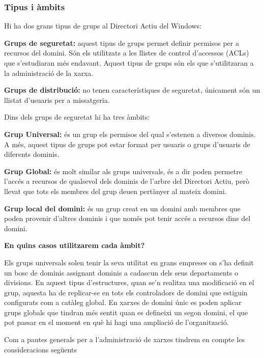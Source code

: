 \documentclass[
  a4paper,
]{article}
\begin{document}
\subsubsection{Tipus i àmbits}\label{tipus-i-uxe0mbits}

Hi ha dos grans tipus de grups al Directori Actiu del Windows:

\textbf{Grups de seguretat:} aquest tipus de grups permet definir
permisos per a recursos del domini. Són els utilitzats a les llistes de
control d'accessos (ACLs) que s'estudiaran més endavant. Aquest tipus de
grups són els que s'utilitzaran a la administració de la xarxa.

\textbf{Grups de distribució:} no tenen característiques de seguretat,
únicament són un llistat d'usuaris per a missatgeria.

Dins dels grups de seguretat hi ha tres àmbits:

\textbf{Grup Universal:} és un grup els permisos del qual s'estenen a
diversos dominis. A més, aquest tipus de grups pot estar format per
usuaris o grups d'usuaris de diferents dominis.

\textbf{Grup Global:} és molt similar als grups universals, és a dir
poden permetre l'accés a recursos de qualsevol dels dominis de l'arbre
del Directori Actiu, però llevat que tots els membres del grup deuen
pertànyer al mateix domini.

\textbf{Grup local del domini:} és un grup creat en un domini amb
membres que poden provenir d'altres dominis i que només pot tenir accés
a recursos dins del domini.

\textbf{En quins casos utilitzarem cada àmbit?}

Els grups universals solen tenir la seva utilitat en grans empreses on
s'ha definit un bosc de dominis assignant dominis a cadascun dels seus
departaments o divisions. En aquest tipus d'estructures, quan se'n
realitza una modificació en el grup, aquesta ha de replicar-se en tots
els controladors de domini que estiguin configurats com a catàleg
global. En xarxes de domini únic es poden aplicar grups globals que
tindran més sentit quan es defineixi un segon domini, el que pot passar
en el moment en què hi hagi una ampliació de l'organització.

Com a pautes generals per a l'administració de xarxes tindrem en compte
les consideracions següents
\end{document}
